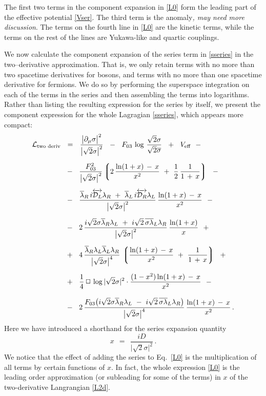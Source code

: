 \documentclass[epsfig,12pt]{article}
\def\beq{\begin{equation}}
\def\eeq{\end{equation}}
\newcommand{\cell}{{\mathcal L}}
\newcommand{\p}{\partial}
\newcommand{\ov}{\overline}
\newcommand{\md}{\mathcal{D}}
\newcommand{\lgr}{\left\lgroup}
\newcommand{\rgr}{\right\rgroup}
\begin{document}
	The first two terms in the component expansion in \eqref{L0} form the 
	leading part of the effective potential \eqref{Vser}.
	The third term is the anomaly{\it, may need more discussion}.
	The terms on the fourth line in \eqref{L0} are the kinetic terms, 
	while the terms on the rest of the lines are Yukawa-like and quartic couplings.

	We now calculate the component expansion of the series term in \eqref{sseries}
	in the two--derivative approximation. 
	That is, we only retain terms with no more than two spacetime derivatives for bosons,
	and terms with no more than one spacetime derivative for fermions.
	We do so by performing the superspace integration on each of the terms in the
	series and then assembling the terms into logarithms.
	Rather than listing the resulting expression for the series by itself, we present the
	component expression for the whole Lagragian \eqref{sseries}, which appears more compact:
\begin{align}
%
\notag
	\cell_\text{two deriv} &    ~~=~~  
	\frac{ \big|\p_\mu \sigma\big|^2 }
	{ \big|\sqrt{2}\sigma\big|^2 }
	~~-~~
	F_{03}\, \log\, \frac{\sqrt{2}\sigma}{\sqrt{2}\ov\sigma}
	~~+~~
	V_\text{eff}
	~~-
	\\[2mm]
%
\notag
	&
	~~-~~
	\frac{F_{03}^2}{\big|\sqrt{2}\sigma\big|^2}
	\lgr 2\, \frac{ \ln (1 + x) \,-\, x } { x^2 }  ~+~
		\frac{1}{2}\, \frac{1}{1 \,+\, x} \rgr
	~~-
	\\[2mm]
%
\notag
	&
	~~-~~
	\frac{
		\ov\lambda{}_R\, i\overleftrightarrow{\md_L} \lambda_R  ~+~ 
		\ov\lambda{}_L\, i\overleftrightarrow{\md_R} \lambda_L
	} { \big|\sqrt{2}\sigma\big|^2 }
	\,
	\frac{ \ln (1 + x) \,-\, x } { x^2 }
	~~-
	\\[2mm]
%
\label{L2d}
	&
	~~-~~ 
	2\,\frac{
		i\sqrt{2}\sigma\ov\lambda{}_R\lambda_L  ~+~  
		i\sqrt{2}\,\ov{\sigma\lambda}{}_L\lambda_R
	} { \big|\sqrt{2}\sigma\big|^2 }\,
	\frac{ \ln (1 + x) } { x }
	~~+
	\\[2mm]
%
\notag
	&
	~~+~~
	4\,\frac{
		\ov\lambda{}_R \lambda_L \ov\lambda{}_L \lambda_R
	} { \big|\sqrt{2}\sigma\big|^4 }\,
	\lgr \frac{ \ln (1 + x) \,-\, x } { x^2 }  ~+~
		\frac{1}{1 \,+\, x} \rgr
	~~+
	\\[2mm]
%
\notag
	&
	~~+~~
	\frac{1}{4}\,\Box\,\log |\sqrt{2}\sigma|^2 \cdot
	\frac{ (1 - x^2) \ln (1 + x) \,-\, x } { x^2 }
	~~-
	\\[3mm]
%
\notag
	&
	~~-~~
	2\,\frac{ F_{03} \big( i\sqrt{2}\sigma\ov\lambda{}_R\lambda_L ~-~
			       i\sqrt{2}\,\ov{\sigma\lambda}{}_L\lambda_R \big) }
		{ \big|\sqrt{2}\sigma\big|^4 }\,
	\frac{ \ln (1 + x) \,-\, x } { x^2 }\,.
\end{align}
	Here we have introduced a shorthand for the series expansion quantity
\beq
	x    ~~=~~    \frac{iD}{\big|\sqrt{2}\sigma\big|^2}\,.
\eeq
	We notice that the effect of adding the series to Eq.~\eqref{L0} is the multiplication of all terms 
	by certain functions of $ x $.
	In fact, the whole expression \eqref{L0}
	is the leading order approximation (or subleading for some of the terms) in $ x $ of 
	the two-derivative Langrangian \eqref{L2d}.
\end{document}
